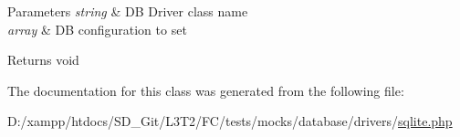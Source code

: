 \begin{DoxyParams}{Parameters}
{\em string} & D\+B Driver class name \\
\hline
{\em array} & D\+B configuration to set \\
\hline
\end{DoxyParams}
\begin{DoxyReturn}{Returns}
void 
\end{DoxyReturn}


The documentation for this class was generated from the following file\+:\begin{DoxyCompactItemize}
\item 
D\+:/xampp/htdocs/\+S\+D\+\_\+\+Git/\+L3\+T2/\+F\+C/tests/mocks/database/drivers/\hyperlink{drivers_2sqlite_8php}{sqlite.\+php}\end{DoxyCompactItemize}
